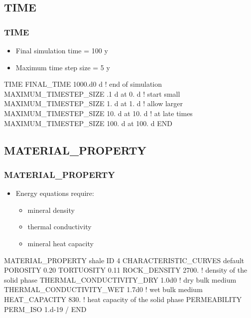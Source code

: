 \documentclass{beamer}
\newcommand\bluecomment[1]{{{\color{blue} #1}}}
\begin{document}
\subsection{TIME}

\begin{frame}[fragile]\frametitle{TIME}
\begin{itemize}
  \item Final simulation time = 100 y
  \item Maximum time step size = 5 y
\end{itemize}

\begin{semiverbatim}

TIME
  FINAL_TIME 1000.d0 d \bluecomment{! end of simulation}
  MAXIMUM_TIMESTEP_SIZE .1 d at 0. d \bluecomment{! start small}
  MAXIMUM_TIMESTEP_SIZE 1. d at 1. d \bluecomment{! allow larger}
  MAXIMUM_TIMESTEP_SIZE 10. d at 10. d \bluecomment{! at late times}
  MAXIMUM_TIMESTEP_SIZE 100. d at 100. d
END
\end{semiverbatim}

\end{frame}

\subsection{MATERIAL\_PROPERTY}

\begin{frame}[fragile]\frametitle{MATERIAL\_PROPERTY}
\begin{itemize}
  \item Energy equations require:
  \begin{itemize}
    \item mineral density
    \item thermal conductivity
    \item mineral heat capacity
  \end{itemize}
\end{itemize}

\begin{semiverbatim}\small
MATERIAL_PROPERTY shale
  ID 4
  CHARACTERISTIC_CURVES default
  POROSITY 0.20
  TORTUOSITY 0.11
  ROCK_DENSITY 2700. \bluecomment{! density of the solid phase}
  THERMAL_CONDUCTIVITY_DRY 1.0d0 \bluecomment{! dry bulk medium}
  THERMAL_CONDUCTIVITY_WET 1.7d0 \bluecomment{! wet bulk medium}
  HEAT_CAPACITY 830. \bluecomment{! heat capacity of the solid phase}
  PERMEABILITY
    PERM_ISO 1.d-19
  /
END
\end{semiverbatim}
\end{frame}
\end{document}
